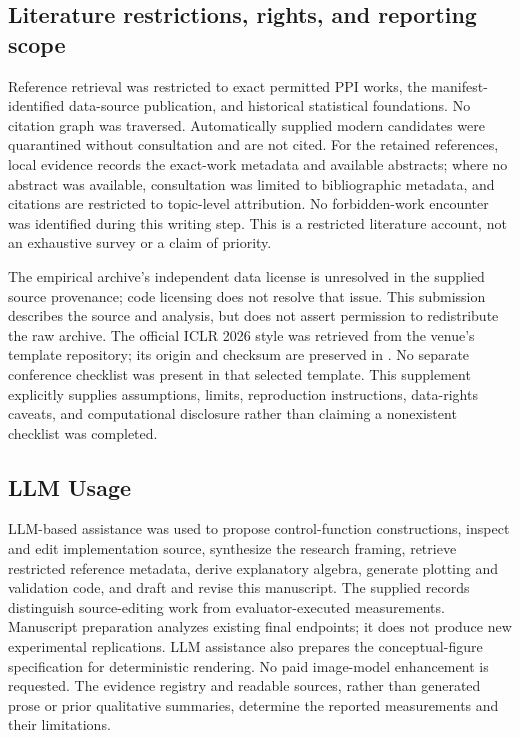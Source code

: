 \documentclass{article}
\begin{document}
\subsection{Literature restrictions, rights, and reporting scope}
Reference retrieval was restricted to exact permitted PPI works, the manifest-identified data-source publication, and historical statistical foundations. No citation graph was traversed. Automatically supplied modern candidates were quarantined without consultation and are not cited. For the retained references, local evidence records the exact-work metadata and available abstracts; where no abstract was available, consultation was limited to bibliographic metadata, and citations are restricted to topic-level attribution. No forbidden-work encounter was identified during this writing step. This is a restricted literature account, not an exhaustive survey or a claim of priority.

The empirical archive's independent data license is unresolved in the supplied source provenance; code licensing does not resolve that issue. This submission describes the source and analysis, but does not assert permission to redistribute the raw archive. The official ICLR 2026 style was retrieved from the venue's template repository; its origin and checksum are preserved in . No separate conference checklist was present in that selected template. This supplement explicitly supplies assumptions, limits, reproduction instructions, data-rights caveats, and computational disclosure rather than claiming a nonexistent checklist was completed.

\subsection{LLM Usage}
LLM-based assistance was used to propose control-function constructions, inspect and edit implementation source, synthesize the research framing, retrieve restricted reference metadata, derive explanatory algebra, generate plotting and validation code, and draft and revise this manuscript. The supplied records distinguish source-editing work from evaluator-executed measurements. Manuscript preparation analyzes existing final endpoints; it does not produce new experimental replications. LLM assistance also prepares the conceptual-figure specification for deterministic rendering. No paid image-model enhancement is requested. The evidence registry and readable sources, rather than generated prose or prior qualitative summaries, determine the reported measurements and their limitations.
\end{document}

